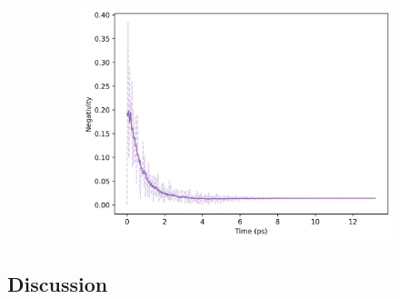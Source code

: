 \documentclass[11pt]{article}
\begin{document}
\begin{figure}[H]
    \vspace{0.5cm}
    
    \begin{subfigure}{0.45\textwidth}
        \centering
        \includegraphics[width=\linewidth]{Research Project/Code/results/ExVib/Open/Negativity/neg_both_eg.png}
        \caption{}
        \label{fig:EVM_OQS_Neg_both_eg}
    \end{subfigure}
    \hfill

    \caption{}
    \label{fig:EVM_OQS_Neg_eg}
\end{figure}
\subsection{Discussion}




































\newpage
\end{document}

